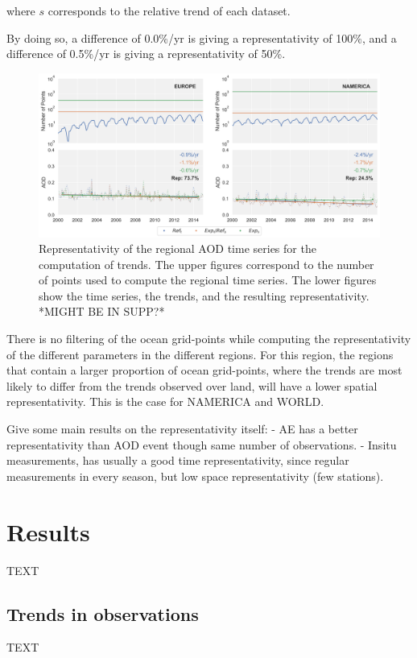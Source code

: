 \documentclass[journal abbreviation, manuscript]{copernicus}
\begin{document}
where $s$ corresponds to the relative trend of each dataset.

By doing so, a difference of 0.0\%/yr is giving a representativity of 100\%, and a difference of 0.5\%/yr is giving a representativity of 50\%.

\begin{figure}[t]
 \includegraphics[width=12cm]{../scripts/figs/representativity.png}
 \caption{Representativity of the regional AOD time series for the computation of trends. The upper figures correspond to the number of points used to compute the regional time series. The lower figures show the time series, the trends, and the resulting representativity. *MIGHT BE IN SUPP?*}
 \label{representativity}
\end{figure}

There is no filtering of the ocean grid-points while computing the representativity of the different parameters in the different regions. For this region, the regions that contain a larger proportion of ocean grid-points, where the trends are most likely to differ from the trends observed over land, will have a lower spatial representativity. This is the case for NAMERICA and WORLD.

Give some main results on the representativity itself:
- AE has a better representativity than AOD event though same number of observations.
- Insitu measurements, has usually a good time representativity, since regular measurements in every season, but low space representativity (few stations).

\section{Results}
TEXT


\subsection{Trends in observations}
TEXT
\end{document}
